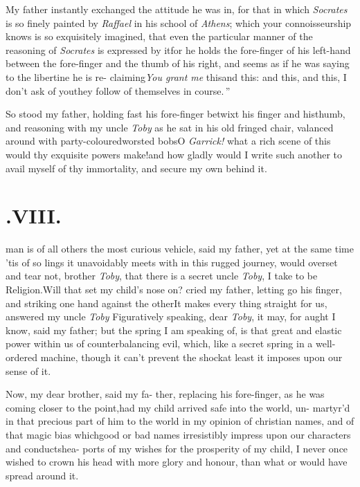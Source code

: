 \documentclass{article}
\begin{document}
My father instantly exchanged the attitude he was in, for that
in which \textit{So\-crates} is so finely painted by \textit{Raffael} in
his school of \textit{Athens}; which your connoisseurship knows is so
exquisitely imagined, that even the particular manner of the
reasoning of \textit{Socrates} is expressed by it\tsk for he holds
the fore-finger of his left-hand between the fore-finger and the
thumb of his right, and seems as if he
was saying to the libertine he is re-\break
claiming\tsk \lqq\textit{You grant me} this\tsk and this:\break
\lqq and this, and this, I don’t ask of\break
\lqq you\tsk they follow of themselves in\break
\lqq course.\,”

So stood my father, holding fast his fore-finger betwixt his
finger and his\break thumb, and reasoning with my
uncle\break
\textit{Toby} as he sat in his old fringed chair, valanced
around with party-coloured\break worsted bobs\tsk O
\textit{Garrick!} what a rich scene of this would thy
exquisite powers make!\@ and how gladly would I write such
another to avail myself of thy immortality, and secure my
own behind it.

\parskip
{}
\newpage
\null\smallskip
\section{.\enspace VIII.}

 man is of all others\break
the most curious vehicle, said my\break
father, yet at the same time ’tis of so 
\break 
lings it unavoidably meets with in this rugged journey,
would overset and tear  not, brother \textit{Toby}, that there is a secret
 uncle
\textit{Toby}, I take to be Religion.\tsk Will that set my
child’s nose on?  cried my father, letting go his finger,
and striking one hand against the other\tsk It makes every
thing straight for us, answered my uncle \textit{Toby}\tsk
Figuratively speaking, dear \textit{Toby}, it may, for aught
I know, said my father; but the spring I am speaking of, is
that great and elastic power within us of counterbalancing
evil, which, like a secret spring in a well-ordered machine,
though it can’t prevent the shock\tsh at least it imposes
upon our sense of it.

Now, my dear brother, said my fa-\break 
ther, replacing his fore-finger, as he was\break
coming closer to the point,\tsk had my\break
child arrived safe into the world, un-\break
martyr’d in that precious part of him\tsk
{} 
to the world in my opinion of christian names, and of
that magic bias which\break good or bad names irresistibly impress
upon our characters and conducts\tsk hea-\break
{}
ports of my wishes for the prosperity of
my child, I never once wished to crown his head with more
glory and honour, than what  or
 would have spread around it.
\end{document}
